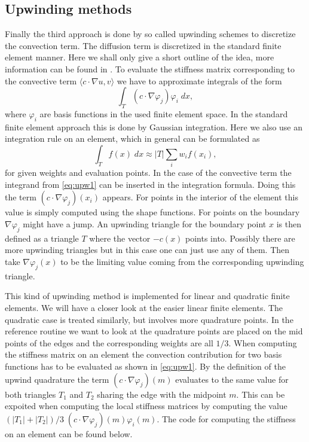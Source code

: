 \subsection{Upwinding methods}
Finally the third approach is done by so called upwinding schemes to discretize the convection term. The diffusion term is discretized in the standard finite element manner. Here we shall only give a short outline of the idea, more information can be found in \cite{S08}. To evaluate the stiffness matrix corresponding to the convective term $\langle c \cdot \nabla u,v\rangle$ we have to approximate integrals of the form
\begin{equation} \label{eq:upw1}
 \int_T (c \cdot \nabla \varphi_j)\varphi_i \; dx,
\end{equation}
where $\varphi_i$ are basis functions in the used finite element space. In the standard finite element approach this is done by Gaussian integration. Here we also use an integration rule on an element, which in general can be formulated as
\begin{equation}
 \int_T f(x) \; dx \approx |T|\sum_i w_i f(x_i),
\end{equation}
for given weights and evaluation points. In the case of the convective term the integrand from \eqref{eq:upw1} can be inserted in the integration formula. Doing this the term $(c \cdot \nabla \varphi_j)(x_i)$ appears. For points in the interior of the element this value is simply computed using the shape functions. For points on the boundary $\nabla \varphi_j$ might have a jump. An upwinding triangle for the boundary point $x$ is then defined as a triangle $T$ where the vector $-c(x)$ points into. Possibly there are more upwinding triangles but in this case one can just use any of them. Then take $\nabla \varphi_j(x)$ to be the limiting value coming from the corresponding upwinding triangle.

This kind of upwinding method is implemented for linear and quadratic finite elements. We will have a closer look at the easier linear finite elements. The quadratic case is treated similarly, but involves more quadrature points. In the reference routine we want to look at the quadrature points are placed on the mid points of the edges and the corresponding weights are all $1/3$. When computing the stiffness matrix on an element the convection contribution for two basis functions has to be evaluated as shown in \ref{eq:upw1}. By the definition of the upwind quadrature the term $(c \cdot \nabla \varphi_j)(m)$ evaluates to the same value for both triangles $T_1$ and $T_2$ sharing the edge with the midpoint $m$. This can be expoited when computing the local stiffness matrices by computing the value $(|T_1|+|T_2|)/3 \; (c \cdot \nabla \varphi_j)(m)\varphi_i(m)$. The code for computing the stiffness on an element can be found below.

